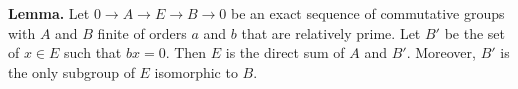 \textbf{Lemma.} Let $0 \to A \to E \to B \to 0$ be an exact sequence of commutative groups with $A$ and $B$ finite of orders $a$ and $b$ that are relatively prime. Let $B'$ be the set of $x \in E$ such that $bx = 0$. Then $E$ is the direct sum of $A$ and $B'$. Moreover, $B'$ is the only subgroup of $E$ isomorphic to $B$.
